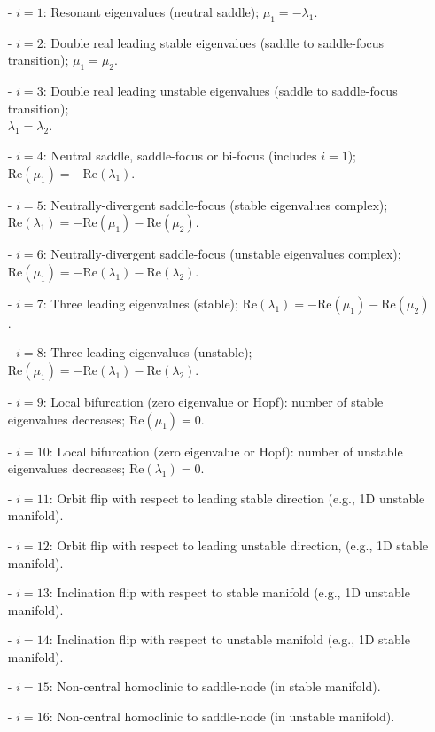 \documentclass[12pt]{report}
\begin{document}
\begin{itemize}
\item[-] $ i=1$: 
Resonant eigenvalues (neutral saddle); $\mu_1=-\lambda_1$.
\item[-] $ i=2$: 
Double real leading stable eigenvalues (saddle to saddle-focus
transition); $\mu_1=\mu_2$. 
\item[-] $ i=3$: 
Double real leading unstable eigenvalues (saddle to saddle-focus
transition);\\ 
$\lambda_1=\lambda_2$. 
\item[-] $ i=4$: 
Neutral saddle, saddle-focus or bi-focus (includes $ i=1$);
$\mbox{Re}(\mu_1)  =  - \mbox{Re}(\lambda_1)$. 
\item[-] $ i=5$: 
Neutrally-divergent saddle-focus (stable eigenvalues complex);\\
$\mbox{Re}(\lambda_1) = - \mbox{Re}(\mu_1) - \mbox{Re}(\mu_2)$.
\item[-] $ i=6$: 
Neutrally-divergent saddle-focus (unstable eigenvalues complex);\\
$\mbox{Re}(\mu_1) = - \mbox{Re}(\lambda_1) - \mbox{Re}(\lambda_2)$. 
\item[-] $ i=7$: 
Three leading eigenvalues (stable);
$\mbox{Re}(\lambda_1) = - \mbox{Re}(\mu_1) - \mbox{Re}(\mu_2)$. 
\item[-] $ i=8$: 
Three leading eigenvalues (unstable);
$\mbox{Re}(\mu_1) = - \mbox{Re}(\lambda_1) - \mbox{Re}(\lambda_2)$.
\item[-] $ i=9$: 
Local bifurcation (zero eigenvalue or Hopf): 
number of stable eigenvalues decreases; $\mbox{Re}(\mu_1)=0$.
\item[-] $ i=10$: 
Local bifurcation (zero eigenvalue or Hopf): 
number of unstable eigenvalues decreases; $\mbox{Re}(\lambda_1)=0$.
\item[-] $ i=11$: 
Orbit flip with respect to leading stable direction 
(e.g., 1D unstable manifold).
\item[-] $ i=12$: 
Orbit flip with respect to leading unstable direction, 
(e.g., 1D stable manifold).
\item[-] $ i=13$: 
Inclination flip with respect to stable manifold
(e.g., 1D unstable manifold).
\item[-] $ i=14$: 
Inclination flip with respect to unstable manifold
(e.g., 1D stable manifold).
\item[-] $ i=15$: 
Non-central homoclinic to saddle-node (in stable manifold).
\item[-] $ i=16$: 
Non-central homoclinic to saddle-node (in unstable manifold).
\end{itemize}
\end{document}
